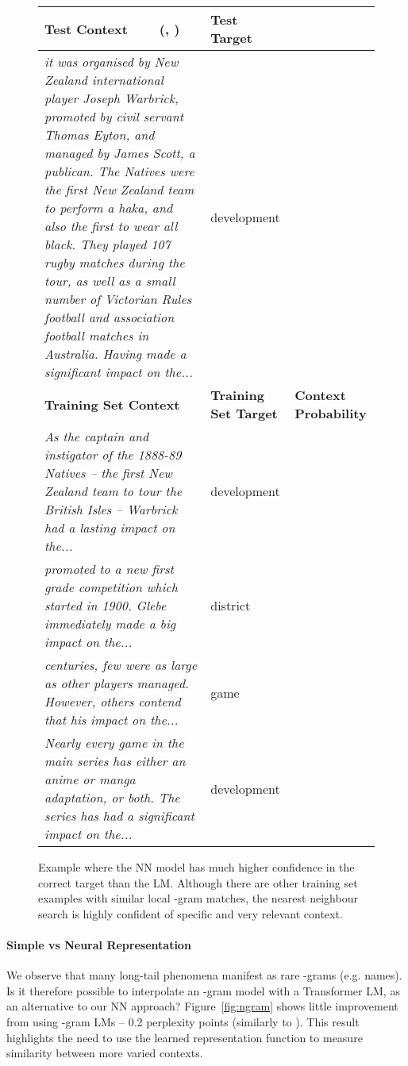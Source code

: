 \documentclass{article} \usepackage{iclr2020_conference,times}
\begin{document}
\begin{figure}[t]
\centering
\small
\begin{tabular}{p{9.5cm}>{\centering\arraybackslash}m{1.6cm}>{\centering\arraybackslash}m{1.6cm}}
        \toprule[1.5pt]
\textbf{Test Context} ~~~ (, )         & \textbf{Test Target}        &                     \\ \midrule[0.75pt]
\emph{it was organised by New Zealand international player Joseph Warbrick, promoted by civil servant Thomas Eyton, and managed by James Scott, a publican. The Natives were the first New Zealand team to perform a haka, and also the first to wear all black. They played 107 rugby matches during the tour, as well as a small number of Victorian Rules football and association football matches in Australia. Having made a significant impact on the...}                    & development                    \\\addlinespace[0.15em]
                     \midrule[0.75pt]
\textbf{Training Set Context} & \textbf{Training Set Target} & \textbf{Context Probability} \\ 
                     \midrule[0.75pt]
\emph{As the captain and instigator of the 1888-89 Natives -- the first New Zealand team to tour the British Isles -- Warbrick had a lasting impact on the...}  &  development        &  0.998                   \\\addlinespace[0.5em]\emph{promoted to a new first grade competition which started in 1900. Glebe immediately made a big impact on the...}  &  district        &  0.00012                   \\\addlinespace[0.5em]\emph{centuries, few were as large as other players managed. However, others contend that his impact on the...}  &  game        &  0.000034                   \\\addlinespace[0.5em]\emph{Nearly every game in the main series has either an anime or manga adaptation, or both. The series has had a significant impact on the...}  &  development        &  0.00000092                   \\
\bottomrule[1.5pt]
\end{tabular}
    \caption{Example where the NN model has much higher confidence in the correct target than the LM. Although there are other training set examples with similar local -gram matches, the nearest neighbour search is highly confident of specific and very relevant context. }
    \label{figure:output}
\end{figure}

\paragraph{Simple vs Neural Representation}
We observe that many long-tail phenomena manifest as rare -grams (e.g. names).
Is it therefore possible to interpolate an -gram model with a Transformer LM, as an alternative to our NN approach?
Figure~\ref{fig:ngram} shows little improvement from using -gram LMs -- 0.2 perplexity points (similarly to \citet{bakhtin2018lightweight}).
This result highlights the need to use the learned representation function  to measure similarity between more varied contexts.
\end{document}
